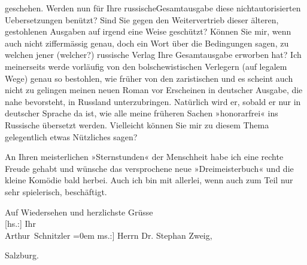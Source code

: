                geschehen. Werden nun für Ihre russischeGesamtausgabe diese
               nichtautorisierten Uebersetzungen benützt? Sind Sie gegen den Weitervertrieb dieser
               älteren, gestohlenen Ausgaben auf irgend eine Weise geschützt? Können Sie mir, wenn
               auch nicht ziffermässig genau, doch ein Wort über die Bedingungen sagen, zu welchen
               jener (welcher?) russische Verlag Ihre Gesamtausgabe erworben hat? Ich
               meinerseits werde vorläufig von den bolschewistischen Verlegern (auf legalem Wege)
               genau so bestohlen, wie früher von den zaristischen und es scheint auch nicht zu
               gelingen meinen neuen Roman
               vor Erscheinen in deutscher Ausgabe, die nahe bevorsteht, in Russland unterzubringen. Natürlich wird er, sobald er nur in
               deutscher Sprache da ist, wie alle meine früheren Sachen »honorarfrei« ins Russische übersetzt werden. Vielleicht können
               Sie mir zu diesem Thema gelegentlich etwas Nützliches sagen?\pend
           
\pstart
           An Ihren meisterlichen »Sternstunden« der
                  Menschheit habe ich eine rechte Freude gehabt und wünsche das versprochene
               neue »Dreimeisterbuch« und
               die kleine Komödie bald
               herbei. Auch ich bin mit allerlei, wenn auch zum Teil nur sehr spielerisch,
               beschäftigt.\pend
           
\pstart
           Auf Wiedersehen und herzlichste Grüsse{\\[\baselineskip]}{[}hs.:{]} Ihr{\\[\baselineskip]}\spacefill\mbox{Arthur Schnitzler}\pend
           \leftskip=0em{}
\pstart
           \noindent{}{[}ms.:{]} Herrn Dr. Stephan Zweig,\pend
           
\pstart
           Salzburg.\pend
           \endnumbering{}
\begin{anhang}
\end{anhang}
      